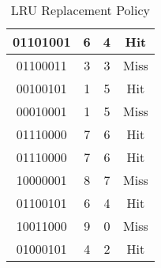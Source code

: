\documentclass[12pt]{article}
\begin{document}
\begin{table}
\begin{tabular}{|c|c|c|c|}
\hline
01101001                                                                     & 6                  & 4                      & Hit                 \\ 
\hline
01100011                                                                     & 3                  & 3                      & Miss                \\ 
\hline
00100101                                                                     & 1                  & 5                      & Hit                 \\ 
\hline
00010001                                                                     & 1                  & 5                      & Miss                \\ 
\hline
01110000                                                                     & 7                  & 6                      & Hit                 \\ 
\hline
01110000                                                                     & 7                  & 6                      & Hit                 \\ 
\hline
10000001                                                                     & 8                  & 7                      & Miss                \\ 
\hline
01100101                                                                     & 6                  & 4                      & Hit                 \\ 
\hline
10011000                                                                     & 9                  & 0                      & Miss                \\ 
\hline
01000101                                                                     & 4                  & 2                      & Hit                 \\
\hline
\end{tabular}
\caption{LRU Replacement Policy}
\end{table}
\end{document}
